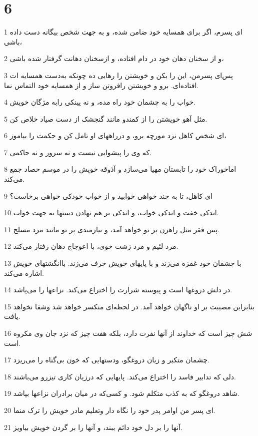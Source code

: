 \chapter{6}

\par 1 ای پسرم، اگر برای همسایه خود ضامن شده، و به جهت شخص بیگانه دست داده باشی،
\par 2 و از سخنان دهان خود در دام افتاده، و ازسخنان دهانت گرفتار شده باشی،
\par 3 پس‌ای پسرمن، این را بکن و خویشتن را رهایی ده چونکه به‌دست همسایه ات افتاده‌ای. برو و خویشتن رافروتن ساز و از همسایه خود التماس نما.
\par 4 خواب را به چشمان خود راه مده، و نه پینکی رابه مژگان خویش.
\par 5 مثل آهو خویشتن را از کمندو مانند گنجشک از دست صیاد خلاص کن.
\par 6 ‌ای شخص کاهل نزد مورچه برو، و درراههای او تامل کن و حکمت را بیاموز،
\par 7 که وی را پیشوایی نیست و نه سرور و نه حاکمی.
\par 8 اماخوراک خود را تابستان مهیا می‌سازد و آذوقه خویش را در موسم حصاد جمع می‌کند.
\par 9 ‌ای کاهل، تا به چند خواهی خوابید و از خواب خودکی خواهی برخاست؟
\par 10 اندکی خفت و اندکی خواب، و اندکی بر هم نهادن دستها به جهت خواب.
\par 11 پس فقر مثل راهزن بر تو خواهد آمد، و نیازمندی بر تو مانند مرد مسلح.
\par 12 مرد لئیم و مرد زشت خوی، با اعوجاج دهان رفتار می‌کند.
\par 13 با چشمان خود غمزه می‌زند و با پایهای خویش حرف می‌زند. باانگشتهای خویش اشاره می‌کند.
\par 14 در دلش دروغها است و پیوسته شرارت را اختراع می‌کند. نزاعها را می‌پاشد.
\par 15 بنابراین مصیبت بر او ناگهان خواهد آمد. در لحظه‌ای منکسر خواهد شد وشفا نخواهد یافت.
\par 16 شش چیز است که خداوند از آنها نفرت دارد، بلکه هفت چیز که نزد جان وی مکروه است.
\par 17 چشمان متکبر و زبان دروغگو، ودستهایی که خون بی‌گناه را می‌ریزد.
\par 18 دلی که تدابیر فاسد را اختراع می‌کند. پایهایی که درزیان کاری تیزرو می‌باشند.
\par 19 شاهد دروغگو که به کذب متکلم شود. و کسی‌که در میان برادران نزاعها بپاشد.
\par 20 ‌ای پسر من اوامر پدر خود را نگاه دار وتعلیم مادر خویش را ترک منما.
\par 21 آنها را بر دل خود دائم ببند، و آنها را بر گردن خویش بیاویز.
